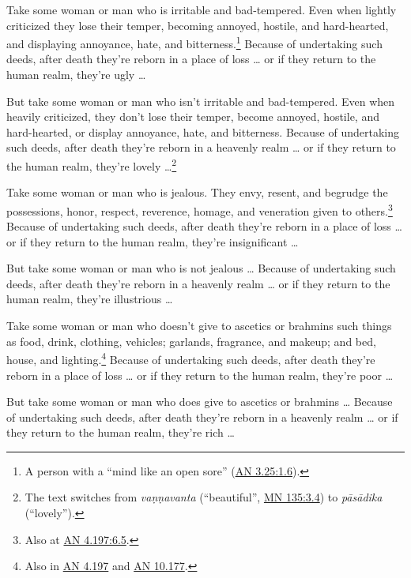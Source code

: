 \documentclass[12pt,openany]{book}%
\begin{document}
Take some woman or man who is irritable and bad-tempered. Even when lightly criticized they lose their temper, becoming annoyed, hostile, and hard-hearted, and displaying annoyance, hate, and bitterness.\footnote{A person with a “mind like an open sore” (\href{https://suttacentral.net/an3.25/en/sujato\#1.6}{AN 3.25:1.6}). } Because of undertaking such deeds, after death they’re reborn in a place of loss … or if they return to the human realm, they’re ugly … 

But take some woman or man who isn’t irritable and bad-tempered. Even when heavily criticized, they don’t lose their temper, become annoyed, hostile, and hard-hearted, or display annoyance, hate, and bitterness. Because of undertaking such deeds, after death they’re reborn in a heavenly realm … or if they return to the human realm, they’re lovely …\footnote{The text switches from \textit{\textsanskrit{vaṇṇavanta}} (“beautiful”, \href{https://suttacentral.net/mn135/en/sujato\#3.4}{MN 135:3.4}) to \textit{\textsanskrit{pāsādika}} (“lovely”). } 

Take some woman or man who is jealous. They envy, resent, and begrudge the possessions, honor, respect, reverence, homage, and veneration given to others.\footnote{Also at \href{https://suttacentral.net/an4.197/en/sujato\#6.5}{AN 4.197:6.5}. } Because of undertaking such deeds, after death they’re reborn in a place of loss … or if they return to the human realm, they’re insignificant … 

But take some woman or man who is not jealous … Because of undertaking such deeds, after death they’re reborn in a heavenly realm … or if they return to the human realm, they’re illustrious … 

Take some woman or man who doesn’t give to ascetics or brahmins such things as food, drink, clothing, vehicles; garlands, fragrance, and makeup; and bed, house, and lighting.\footnote{Also in \href{https://suttacentral.net/an4.197/en/sujato}{AN 4.197} and \href{https://suttacentral.net/an10.177/en/sujato}{AN 10.177}. } Because of undertaking such deeds, after death they’re reborn in a place of loss … or if they return to the human realm, they’re poor … 

But take some woman or man who does give to ascetics or brahmins … Because of undertaking such deeds, after death they’re reborn in a heavenly realm … or if they return to the human realm, they’re rich … 
\end{document}
